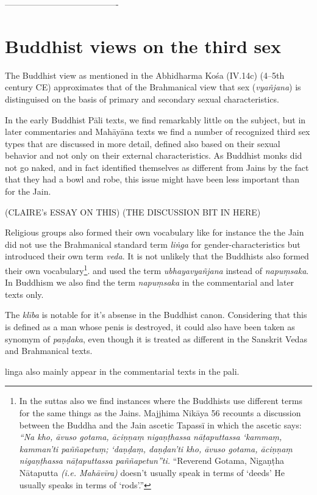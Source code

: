 ----------------------------------------


\section{Buddhist views on the third sex}
The Buddhist view as mentioned in the Abhidharma Kośa (IV.14c) (4–5th century CE) approximates that of the Brahmanical view that sex ({\em vyañjana}) is distinguised on the basis of primary and secondary sexual characteristics.

In the early Buddhist Pāli texts, we find remarkably little on the subject, but in later commentaries and Mahāyāna texts we find a number of recognized third sex types that are discussed in more detail, defined also based on their sexual behavior and not only on their external characteristics. As Buddhist monks did not go naked, and in fact identified themselves as different from Jains by the fact that they had a bowl and robe, this issue might have been less important than for the Jain.


(CLAIRE's ESSAY ON THIS)
(THE DISCUSSION BIT IN HERE)




Religious groups also formed their own vocabulary like for instance the the Jain did not use the Brahmanical standard term {\em liṅga} for gender-characteristics but introduced their own term {\em veda}. It is not unlikely that the Buddhists also formed their own vocabulary\footnote{In the suttas also we find instances where the Buddhists use different terms for the same things as the Jains. Majjhima Nikāya 56 recounts a discussion between the Buddha and the Jain ascetic Tapassī in which the ascetic says: {\em “Na kho, āvuso gotama, āciṇṇaṃ nigaṇṭhassa nāṭaputtassa ‘kammaṃ, kamman’ti paññapetuṃ; ‘daṇḍaṃ, daṇḍan’ti kho, āvuso gotama, āciṇṇaṃ nigaṇṭhassa nāṭaputtassa paññapetun”ti.} “Reverend Gotama, Nigaṇṭha Nātaputta {\em (i.e. Mahāvīra)} doesn’t usually speak in terms of ‘deeds’ He usually speaks in terms of ‘rods’.” }. and used the term {\em ubhayavyañjana} instead of {\em napuṃsaka}. In Buddhism we also find the term {\em napuṃsaka} in the commentarial and later texts only.


The {\em klība} is notable for it's absense in the Buddhist canon. Considering that this is defined as a man whose penis is destroyed, it could also have been taken as synomym of {\em paṇḍaka}, even though it is treated as different in the Sanskrit Vedas and Brahmanical texts.

linga also mainly appear in the commentarial texts in the pali.